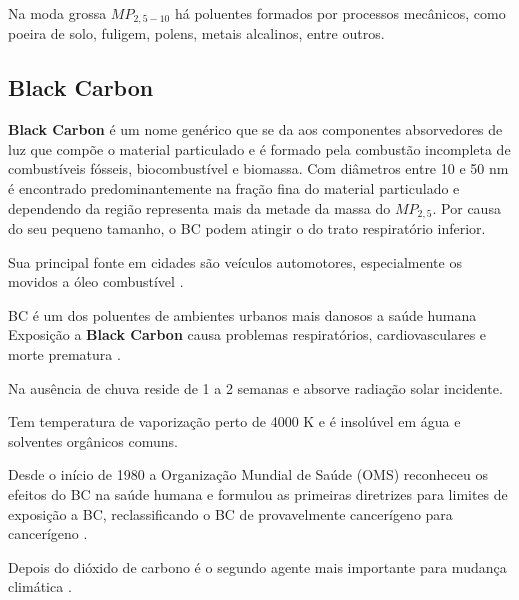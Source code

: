 Na moda grossa $MP_{2,5-10}$ há poluentes formados por processos mecânicos, 
como poeira de solo, fuligem, polens, metais alcalinos, entre outros. 

\subsection{Black Carbon}

\textbf{Black Carbon} é um nome genérico que se da aos componentes
absorvedores de luz que compõe o material particulado e é formado pela combustão
incompleta de combustíveis fósseis, biocombustível e biomassa.
Com diâmetros entre 10 e 50 nm é encontrado predominantemente na fração fina 
do material particulado e dependendo da região representa mais da metade 
da massa do $MP_{2,5}$. Por causa do seu pequeno tamanho, o BC podem atingir o
do trato respiratório inferior.

Sua principal fonte em cidades são veículos automotores, 
especialmente os movidos a óleo combustível \citep{petzold2013}. 

BC é um dos poluentes de ambientes urbanos mais danosos a saúde humana 
Exposição a \textbf{Black Carbon} causa problemas respiratórios, 
cardiovasculares e morte prematura \citep{jacobson2014}.

Na ausência de chuva reside de 1 a 2 semanas e absorve radiação solar incidente.

Tem temperatura de vaporização perto de 4000 K e é insolúvel em água e 
solventes orgânicos comuns.

Desde o início de 1980 a Organização Mundial de Saúde (OMS)
reconheceu os efeitos do BC na saúde humana e formulou as primeiras diretrizes
para limites de exposição a BC, reclassificando o BC de 
provavelmente cancerígeno para cancerígeno \citep{petzold2013}.

Depois do dióxido de carbono é o segundo agente mais importante
para  mudança climática \citep{bond2013}.



